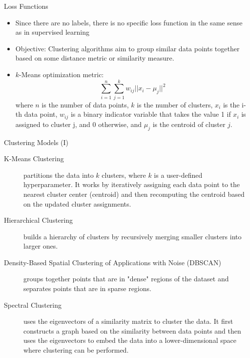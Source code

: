 \documentclass[aspectratio=169]{../latex_main/tntbeamer}  %
\begin{document}
    
    \begin{frame}[c]{Loss Functions}

    \begin{itemize}
        \item Since there are no labels, there is no specific loss function in the same sense as in supervised learning
        \item \alert{Objective:} Clustering algorithms aim to group similar data points together based on some distance metric or similarity measure.
        \pause
        \medskip
        \item $k$-Means optimization metric:
        $$\sum_{i=1}^{n}\sum_{j=1}^{k} w_{ij} ||x_i - \mu_j||^2$$
        where $n$ is the number of data points, $k$ is the number of clusters, $x_i$ is the i-th data point, $w_{ij}$ is a binary indicator variable that takes the value 1 if $x_i$ is assigned to cluster j, and 0 otherwise, and $\mu_j$ is the centroid of cluster $j$.
        \end{itemize}
    
    \end{frame}

    \begin{frame}[c]{Clustering Models (I)}
        \begin{description}
            \item[K-Means Clustering] partitions the data into $k$ clusters, where $k$ is a user-defined hyperparameter. It works by iteratively assigning each data point to the nearest cluster center (centroid) and then recomputing the centroid based on the updated cluster assignments.
            \pause
            \item[Hierarchical Clustering] builds a hierarchy of clusters by recursively merging smaller clusters into larger ones.
            \pause
            \item[Density-Based Spatial Clustering of Applications with Noise (DBSCAN)] groups together points that are in "dense" regions of the dataset and separates points that are in sparse regions.
            \pause
            \item[Spectral Clustering] uses the eigenvectors of a similarity matrix to cluster the data. It first constructs a graph based on the similarity between data points and then uses the eigenvectors to embed the data into a lower-dimensional space where clustering can be performed.
        \end{description}

    \end{frame}
\end{document}
